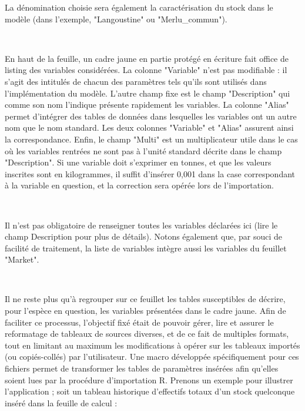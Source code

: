 \documentclass[12pt, colorinlistoftodos, notitlepage]{report}
\newenvironment{not used}[1]{%
    \longtable{%
        |>{\centering$\displaystyle}A{#1}{1}<{$}%
        |}\hline\ignorespaces}{%
    \endlongtable\ignorespacesafterend}
\newcommand\Warning{%
 \makebox[1.4em][c]{%
 \makebox[0pt][c]{\raisebox{.1em}{\small!}}%
 \makebox[0pt][c]{\color{red}\Large$\bigtriangleup$}}}%
\begin{document}
\Warning La dénomination choisie sera également la caractérisation du stock dans le modèle (dans l'exemple, "Langoustine" ou "Merlu\_commun").

\par~\par

En haut de la feuille, un cadre jaune en partie protégé en écriture fait office de listing des variables considérées. La colonne "Variable" n'est pas modifiable : il s'agit des intitulés de chacun des paramètres tels qu'ils sont utilisés dans l'implémentation du modèle. L'autre champ fixe est le champ "Description" qui comme son nom l'indique présente rapidement les variables. La colonne "Alias" permet d'intégrer des tables de données dans lesquelles les variables ont un autre nom que le nom standard. Les deux colonnes "Variable" et "Alias" assurent ainsi la correspondance. Enfin, le champ "Multi" est un multiplicateur utile dans le cas où les variables rentrées ne sont pas à l'unité standard décrite dans le champ "Description". Si une variable doit s'exprimer en tonnes, et que les valeurs inscrites sont en kilogrammes, il suffit d'insérer 0,001 dans la case correspondant à la variable en question, et la correction sera opérée lors de l'importation.

\par~\par

\Warning Il n'est pas obligatoire de renseigner toutes les variables déclarées ici (lire le champ Description pour plus de détails). Notons également que, par souci de facilité de traitement, la liste de variables intègre aussi les variables du feuillet "Market".

\par~\par

Il ne reste plus qu'à regrouper sur ce feuillet les tables susceptibles de décrire, pour l'espèce en question, les variables présentées dans le cadre jaune. Afin de faciliter ce processus, l'objectif fixé était de pouvoir gérer, lire et assurer le reformatage de tableaux de sources diverses, et de ce fait de multiples formats, tout en limitant au maximum les modifications à opérer sur les tableaux importés (ou copiés-collés) par l'utilisateur. Une macro développée spécifiquement pour ces fichiers permet de transformer les tables de paramètres insérées afin qu'elles soient lues par la procédure d'importation R. Prenons un exemple pour illustrer l'application ; soit un tableau historique d'effectifs totaux d'un stock quelconque inséré dans la feuille de calcul :
\end{document}
